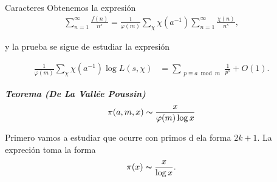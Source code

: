 \documentclass[final]{beamer}
\newlength{\sepwidth}
\newlength{\colwidth}
\newcommand{\separatorcolumn}{\begin{column}{\sepwidth}\end{column}}
\newcommand{\defi}[1]{\textbf{\textsl{#1}}}
\begin{document}
\begin{frame}[t,fragile]
\begin{columns}[t]
\begin{column}{\colwidth}
\begin{block}{Caracteres}
Obtenemos la expresión
    \begin{align*}
    \sum_{n=1}^{\infty}\frac{f(n)}{n^s}=\frac{1}{\varphi(m)}\sum_{\chi}\chi(a^{-1})\sum_{n=1}^{\infty}\frac{\chi(n)}{n^s}
,\end{align*}

y la prueba se sigue de estudiar la expresión

\begin{align*}
    \frac{1}{\varphi(m)} \sum_{\chi} \chi(a^{-1}) \log L(s, \chi)
&=\sum_{\substack{p \equiv a\bmod{m}}} \frac{1}{p^s} + O(1)
.\end{align*}
\begin{exampleblock}
    {}\defi{Teorema (De La Vallée Poussin) }$$\pi(a,m,x)\thicksim \dfrac{x}{\varphi(m)\log x}$$
\end{exampleblock}
Primero vamos a estudiar que ocurre con primos d ela forma $2k+1$. La expreción toma la forma
$$\pi(x)\thicksim \dfrac{x}{\log x}.$$
\end{block}
\end{column}

\separatorcolumn


\end{columns}
\end{frame}
\end{document}
